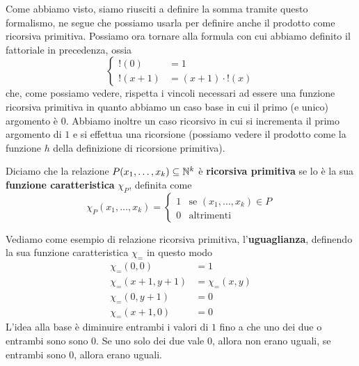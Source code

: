 Come abbiamo visto, siamo riusciti a definire la somma tramite
questo formalismo, ne segue che possiamo usarla per definire
anche il prodotto come ricorsiva primitiva. Possiamo ora
tornare alla formula con cui abbiamo definito il fattoriale
in precedenza, ossia
\[
	\begin{cases}
		!(0)     & = 1                  \\
		!(x + 1) & = (x + 1) \cdot !(x)
	\end{cases}
\]
che, come possiamo vedere, rispetta i vincoli necessari ad
essere una funzione ricorsiva primitiva in quanto abbiamo un
caso base in cui il primo (e unico) argomento è $0$. Abbiamo
inoltre un caso ricorsivo in cui si incrementa il primo
argomento di $1$ e si effettua una ricorsione (possiamo vedere
il prodotto come la funzione $h$ della definizione di ricorsione
primitiva).

\begin{definition} \label{def: relazione ricorsiva}
	Diciamo che la relazione $P(x_1, \dots, x_k) \subseteq \mathbb{N}^k$
	è \textbf{ricorsiva primitiva} se lo è la sua
	\textbf{funzione caratteristica} $\chi_P$, definita come
	\[
		\chi_P (x_1, \dots, x_k) = \begin{cases}
			1 & \text{se } (x_1, \dots, x_k) \in P \\
			0 & \text{altrimenti}
		\end{cases}
	\]
\end{definition}

Vediamo come esempio di relazione ricorsiva primitiva,
l'\textbf{uguaglianza}, definendo la sua funzione
caratteristica $\chi_=$ in questo modo
\begin{align*}
	\chi_= (0, 0)         & = 1             \\
	\chi_= (x + 1, y + 1) & = \chi_= (x, y) \\
	\chi_= (0, y + 1)     & = 0             \\
	\chi_= (x + 1, 0)     & = 0
\end{align*}
L'idea alla base è diminuire entrambi i valori di $1$ fino a
che uno dei due o entrambi sono sono $0$. Se uno solo dei due
vale $0$, allora non erano uguali, se entrambi sono $0$, allora
erano uguali.

